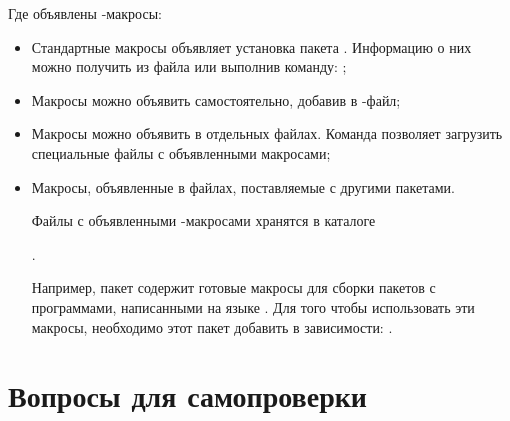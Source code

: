 Где объявлены -макросы:
\begin{itemize}
	\item Стандартные макросы объявляет установка пакета .
	 Информацию о них можно получить из файла  или выполнив 
		команду: ;
	 \item Макросы можно объявить самостоятельно, добавив в -файл;
	 \item Макросы можно объявить в отдельных файлах.
	 Команда  позволяет загрузить специальные файлы с объявленными макросами;
	 \item Макросы, объявленные в файлах, поставляемые с другими пакетами.

	 Файлы с объявленными -макросами хранятся в каталоге

		.

	 Например, пакет  содержит готовые макросы для сборки пакетов с программами, написанными на языке .
	 Для того чтобы использовать эти макросы, необходимо этот пакет добавить в зависимости:
	 .
\end{itemize}



\section{Вопросы для самопроверки}

